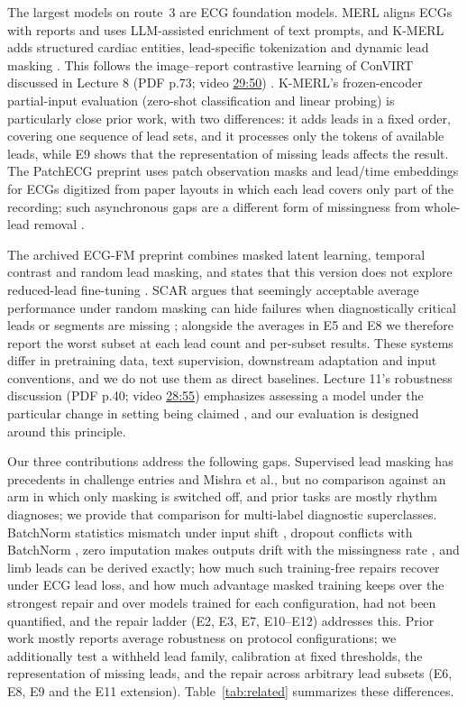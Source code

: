 The largest models on route~3 are ECG foundation models. MERL aligns ECGs with reports and uses LLM-assisted enrichment of text prompts, and K-MERL adds structured cardiac entities, lead-specific tokenization and dynamic lead masking \citep{liu2024merl,liu2025kmerl}. This follows the image--report contrastive learning of ConVIRT discussed in Lecture 8 (PDF p.73; video \href{https://youtu.be/E5X3YW451Rs?t=1790}{29:50}) \citep{md6329lecture08}. K-MERL's frozen-encoder partial-input evaluation (zero-shot classification and linear probing) is particularly close prior work, with two differences: it adds leads in a fixed order, covering one sequence of lead sets, and it processes only the tokens of available leads, while E9 shows that the representation of missing leads affects the result. The PatchECG preprint uses patch observation masks and lead/time embeddings for ECGs digitized from paper layouts in which each lead covers only part of the recording; such asynchronous gaps are a different form of missingness from whole-lead removal \citep{zhang2025patchecg}.

The archived ECG-FM preprint combines masked latent learning, temporal contrast and random lead masking, and states that this version does not explore reduced-lead fine-tuning \citep{mckeen2025ecgfm}. SCAR argues that seemingly acceptable average performance under random masking can hide failures when diagnostically critical leads or segments are missing \citep{liu2026scar}; alongside the averages in E5 and E8 we therefore report the worst subset at each lead count and per-subset results. These systems differ in pretraining data, text supervision, downstream adaptation and input conventions, and we do not use them as direct baselines. Lecture 11's robustness discussion (PDF p.40; video \href{https://youtu.be/DDU159QXVzI?t=1735}{28:55}) emphasizes assessing a model under the particular change in setting being claimed \citep{md6329lecture11}, and our evaluation is designed around this principle.

Our three contributions address the following gaps. Supervised lead masking has precedents in challenge entries and Mishra et al., but no comparison against an arm in which only masking is switched off, and prior tasks are mostly rhythm diagnoses; we provide that comparison for multi-label diagnostic superclasses. BatchNorm statistics mismatch under input shift \citep{li2018adabn,schneider2020covariate}, dropout conflicts with BatchNorm \citep{li2019variance}, zero imputation makes outputs drift with the missingness rate \citep{yi2020zeroimputation}, and limb leads can be derived exactly; how much such training-free repairs recover under ECG lead loss, and how much advantage masked training keeps over the strongest repair and over models trained for each configuration, had not been quantified, and the repair ladder (E2, E3, E7, E10--E12) addresses this. Prior work mostly reports average robustness on protocol configurations; we additionally test a withheld lead family, calibration at fixed thresholds, the representation of missing leads, and the repair across arbitrary lead subsets (E6, E8, E9 and the E11 extension). Table~\ref{tab:related} summarizes these differences.

